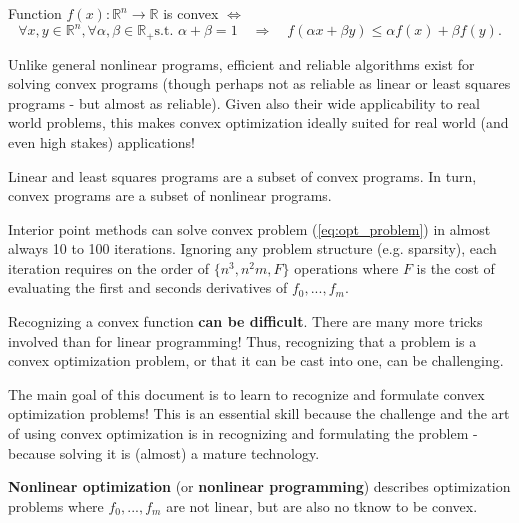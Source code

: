 \begin{Definition} Function $f(x):\mathbb R^n\to\mathbb R$ is convex $\Leftrightarrow$
  \begin{equation*} \forall x,y\in\mathbb R^n, \forall \alpha,\beta\in\mathbb R_+\text{
      s.t. }\alpha+\beta=1\quad\Rightarrow\quad f(\alpha x+\beta y)\le \alpha f(x)+\beta f(y).
  \end{equation*}
\end{Definition}

Unlike general nonlinear programs, efficient and reliable algorithms exist for solving convex programs (though perhaps
not as reliable as linear or least squares programs - but almost as reliable). Given also their wide applicability to
real world problems, this makes convex optimization ideally suited for real world (and even high stakes) applications!

\begin{Fact}
  Linear and least squares programs are a subset of convex programs. In turn, convex programs are a subset of
  nonlinear programs.
\end{Fact}

\begin{Fact}
  Interior point methods can solve convex problem (\ref{eq:opt_problem}) in almost always 10 to 100
  iterations. Ignoring any problem structure (e.g. sparsity), each iteration requires on the order of $\{n^3, n^2m, F\}$
  operations where $F$ is the cost of evaluating the first and seconds derivatives of $f_0,...,f_m$.
\end{Fact}

Recognizing a convex function \textbf{can be difficult}. There are many more tricks involved than for linear
programming! Thus, recognizing that a problem is a convex optimization problem, or that it can be cast into one, can be
challenging.

\begin{Fact}
  The main goal of this document is to learn to recognize and formulate convex optimization problems! This is an
  essential skill because the challenge and the art of using convex optimization is in recognizing and formulating the
  problem - because solving it is (almost) a mature technology.
\end{Fact}


\begin{Definition}
  \textbf{Nonlinear optimization} (or \textbf{nonlinear programming}) describes optimization problems where
  $f_0,...,f_m$ are not linear, but are also no tknow to be convex.
\end{Definition}


